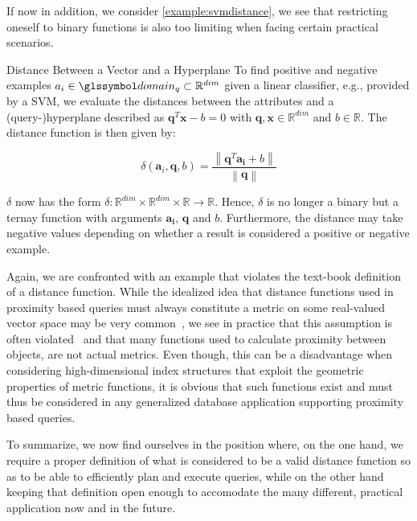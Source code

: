 If now in addition, we consider \cref{example:svmdistance}, we see that restricting oneself to binary functions is also too limiting when facing certain practical scenarios.

\begin{example}[label=example:svmdistance]{Distance Between a Vector and a Hyperplane}{}
    To find positive and negative examples $a_{i} \in \domain_q \subset \mathbb{R}^{dim}$ given a linear classifier, e.g., provided by a SVM, we evaluate the distances between the attributes and a (query-)hyperplane described as $\mathbf{q}^T\mathbf{x} - b = 0$ with $\mathbf{q},\mathbf{x} \in \mathbb{R}^{dim}$ and $b \in \mathbb{R}$. The distance function is then given by:

    \begin{equation}
        \delta (\mathbf{a}_i, \mathbf{q}, b) = \frac{\left\|\mathbf{q}^T \mathbf{a_i} + b \right\|}{\left\|\mathbf{q}\right\|}
    \end{equation}
    
    $\delta$ now has the form $\delta \colon \mathbb{R}^{dim} \times \mathbb{R}^{dim} \times \mathbb{R} \to \mathbb{R}$. Hence, $\delta$ is no longer a binary but a ternay function with arguments $\mathbf{a_{i}}$, $\mathbf{q}$ and $b$. Furthermore, the distance may take negative values depending on whether a result is considered a positive or negative example.
\end{example}


Again, we are confronted with an example that violates the text-book definition of a distance function. While the idealized idea that distance functions used in proximity based queries must always constitute a metric on some real-valued vector space may be very common~\cite{Zezula:2006similarity}, we see in practice that this assumption is often violated~\cite{Bernhauer:2019Nonmetric}  and that many functions used to calculate proximity between objects, are not actual metrics. Even though, this can be a disadvantage when considering high-dimensional index structures that exploit the geometric properties of metric functions, it is obvious that such functions exist and must thus be considered in any generalized database application supporting proximity based queries. 

To summarize, we now find ourselves in the position where, on the one hand, we require a proper definition of what is considered to be a valid distance function so as to be able to efficiently plan and execute queries, while on the other hand keeping that definition open enough to accomodate the many different, practical application now and in the future.

